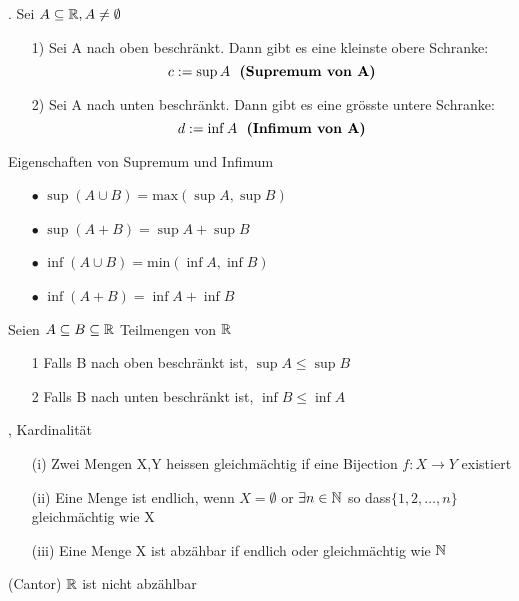 \Satz[1.15]. Sei \(A \subseteq \mathbb{R}, A \neq \emptyset\)
\begin{enumerate}
\item[1)]  Sei A nach oben beschränkt. Dann gibt es eine kleinste obere Schranke: 
\[c:=\sup A \text{ \ \textbf{(Supremum von A)}}\]
\item[2)]  Sei A nach unten beschränkt. Dann gibt es eine grösste untere Schranke: 
\[d:=\inf A \text{ \ \textbf{(Infimum von A)}} \]  
\end{enumerate}

Eigenschaften von Supremum und Infimum
\begin{enumerate}
\item[\(\bullet\)]  \(\sup (A \cup B) = \text{max} (\sup A, \sup B)\)
\item[\(\bullet\)]  \(\sup (A + B) = \sup A + \sup B\)
\item[\(\bullet\)]  \(\inf (A \cup B) = \text{min} (\inf A, \inf B)\)
\item[\(\bullet\)]  \(\inf (A + B) = \inf A + \inf B\)
\end{enumerate}
\Korollar[1.16]  Seien \(A \subseteq B \subseteq \mathbb{R}\) Teilmengen von \(\mathbb{R}\)
\begin{enumerate}
    \item [1] Falls B nach oben beschränkt ist, \newline \(\sup A \leq \sup B\)
    \item [2] Falls B nach unten beschränkt ist, \newline\(\inf B \leq \inf A\)
\end{enumerate}
\sep
\Def[1.18] Kardinalität
\begin{enumerate}
    \item [(i)] Zwei Mengen X,Y heissen gleichmächtig if eine Bijection \(f: X \rightarrow Y\) existiert
    \item [(ii)] Eine Menge ist endlich, wenn \(X = \emptyset\) or \(\exists n \in \mathbb{N}\) so dass\(\{1,2,\dots,n\}\)gleichmächtig wie X
    \item [(iii)] Eine Menge X ist abzähbar if endlich oder gleichmächtig wie \(\mathbb{N}\)
\end{enumerate}
\Satz[1.20] (Cantor) \(\mathbb{R}\) ist nicht abzählbar
